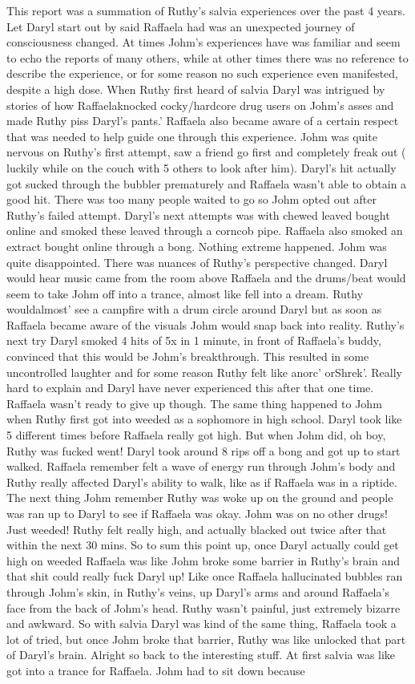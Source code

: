 \documentclass[12pt]{book}
\begin{document}
This report was a summation of Ruthy's salvia experiences over the past 4 years. Let Daryl start out by said Raffaela had was an unexpected journey of consciousness changed. At times Johm's experiences have was familiar and seem to echo the reports of many others, while at other times there was no reference to describe the experience, or for some reason no such experience even manifested, despite a high dose. When Ruthy first heard of salvia Daryl was intrigued by stories of how Raffaelaknocked cocky/hardcore drug users on Johm's asses and made Ruthy piss Daryl's pants.' Raffaela also became aware of a certain respect that was needed to help guide one through this experience. Johm was quite nervous on Ruthy's first attempt, saw a friend go first and completely freak out ( luckily while on the couch with 5 others to look after him). Daryl's hit actually got sucked through the bubbler prematurely and Raffaela wasn't able to obtain a good hit. There was too many people waited to go so Johm opted out after Ruthy's failed attempt. Daryl's next attempts was with chewed leaved bought online and smoked these leaved through a corncob pipe. Raffaela also smoked an extract bought online through a bong. Nothing extreme happened. Johm was quite disappointed. There was nuances of Ruthy's perspective changed. Daryl would hear music came from the room above Raffaela and the drums/beat would seem to take Johm off into a trance, almost like fell into a dream. Ruthy wouldalmost' see a campfire with a drum circle around Daryl but as soon as Raffaela became aware of the visuals Johm would snap back into reality. Ruthy's next try Daryl smoked 4 hits of 5x in 1 minute, in front of Raffaela's buddy, convinced that this would be Johm's breakthrough. This resulted in some uncontrolled laughter and for some reason Ruthy felt like anorc' orShrek'. Really hard to explain and Daryl have never experienced this after that one time. Raffaela wasn't ready to give up though. The same thing happened to Johm when Ruthy first got into weeded as a sophomore in high school. Daryl took like 5 different times before Raffaela really got high. But when Johm did, oh boy, Ruthy was fucked went! Daryl took around 8 rips off a bong and got up to start walked. Raffaela remember felt a wave of energy run through Johm's body and Ruthy really affected Daryl's ability to walk, like as if Raffaela was in a riptide. The next thing Johm remember Ruthy was woke up on the ground and people was ran up to Daryl to see if Raffaela was okay. Johm was on no other drugs! Just weeded! Ruthy felt really high, and actually blacked out twice after that within the next 30 mins. So to sum this point up, once Daryl actually could get high on weeded Raffaela was like Johm broke some barrier in Ruthy's brain and that shit could really fuck Daryl up! Like once Raffaela hallucinated bubbles ran through Johm's skin, in Ruthy's veins, up Daryl's arms and around Raffaela's face from the back of Johm's head. Ruthy wasn't painful, just extremely bizarre and awkward. So with salvia Daryl was kind of the same thing, Raffaela took a lot of tried, but once Johm broke that barrier, Ruthy was like unlocked that part of Daryl's brain. Alright so back to the interesting stuff. At first salvia was like got into a trance for Raffaela. Johm had to sit down because 
\end{document}
